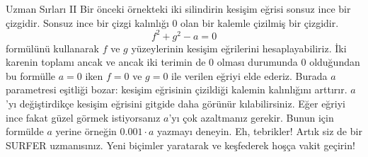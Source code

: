 \begin{surferPage}{Uzman Sırları II}
Bir önceki örnekteki iki silindirin kesişim eğrisi sonsuz ince bir çizgidir. 
Sonsuz ince bir çizgi kalınlığı 0 olan bir kalemle çizilmiş bir çizgidir. 
\[ f^2+g^2-a=0\]
formülünü kullanarak $f$ ve $g$ yüzeylerinin kesişim eğrilerini hesaplayabiliriz.
İki karenin toplamı ancak ve ancak iki terimin de 0 olması durumunda 0 olduğundan
bu formülle  $a=0$ iken $f=0$ ve $g=0$ ile verilen eğriyi elde ederiz.
Burada $a$ parametresi eşitliği bozar: kesişim eğrisinin çizildiği kalemin kalınlığını arttırır.
$a$'yı değiştirdikçe kesişim eğrisini gitgide daha görünür kılabilirsiniz.
Eğer eğriyi ince fakat güzel görmek istiyorsanız $a$'yı çok azaltmanız gerekir.
Bunun için formülde $a$ yerine örneğin $0.001\cdot a$ yazmayı deneyin. 
\newline \newline
Eh, tebrikler! Artık siz de bir  SURFER uzmanısınız. Yeni biçimler yaratarak ve keşfederek hoşça vakit geçirin!
\end{surferPage}
